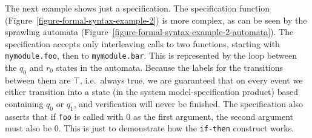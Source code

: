 The next example shows just a specification. The specification function
(Figure~\ref{figure-formal-syntax-example-2}) is more complex, as can be seen
by the sprawling automata
(Figure~\ref{figure-formal-syntax-example-2-automata}). The specification
accepts only interleaving calls to two functions, starting with
\texttt{mymodule.foo}, then to \texttt{mymodule.bar}. This is represented by
the loop between the $q_0$ and $r_0$ states in the automata. Because the labels
for the transitions between them are $\top$, i.e.\ always true, we are
guaranteed that on every event we either transition into a state (in the system
model-specification product) based containing $q_0$ or $q_1$, and verification
will never be finished. The specification also asserts that if \texttt{foo} is
called with $0$ as the first argument, the second argument must also be $0$.
This is just to demonstrate how the \texttt{if-then} construct works.



